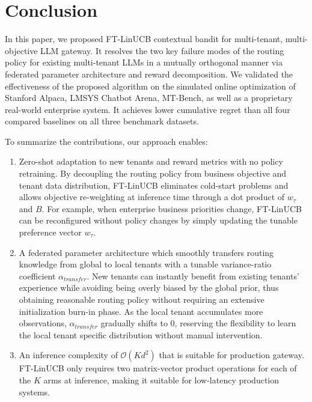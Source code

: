 \documentclass[conference]{IEEEtran}
\begin{document}
\section{Conclusion}

In this paper, we proposed FT-LinUCB contextual bandit for multi-tenant, multi-objective LLM gateway. It resolves the two key failure modes of the routing policy for existing multi-tenant LLMs in a mutually orthogonal manner via federated parameter architecture and reward decomposition. We validated the effectiveness of the proposed algorithm on the simulated online optimization of Stanford Alpaca, LMSYS Chatbot Arena, MT-Bench, as well as a proprietary real-world enterprise system. It achieves lower cumulative regret than all four compared baselines on all three benchmark datasets.

To summarize the contributions, our approach enables:
\begin{enumerate}
  \item Zero-shot adaptation to new tenants and reward metrics with no policy retraining. By decoupling the routing policy from business objective and tenant data distribution, FT-LinUCB eliminates cold-start problems and allows objective re-weighting at inference time through a dot product of $w_\tau$ and $B$. For example, when enterprise business priorities change, FT-LinUCB can be reconfigured without policy changes by simply updating the tunable preference vector $w_\tau$.
  \item A federated parameter architecture which smoothly transfers routing knowledge from global to local tenants with a tunable variance-ratio coefficient $\alpha_{transfer}$. New tenants can instantly benefit from existing tenants' experience while avoiding being overly biased by the global prior, thus obtaining reasonable routing policy without requiring an extensive initialization burn-in phase. As the local tenant accumulates more observations, $\alpha_{transfer}$ gradually shifts to $0$, reserving the flexibility to learn the local tenant specific distribution without manual intervention.
  \item An inference complexity of $\mathcal{O}(Kd^2)$ that is suitable for production gateway. FT-LinUCB only requires two matrix-vector product operations for each of the $K$ arms at inference, making it suitable for low-latency production systems.
\end{enumerate}
\end{document}
